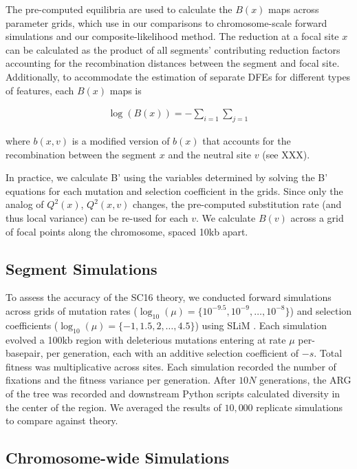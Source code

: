 \documentclass[11pt]{article}
\begin{document}
The pre-computed equilibria are used to calculate the $B(x)$ maps across
parameter grids, which use in our comparisons to chromosome-scale forward
simulations and our composite-likelihood method. The reduction at a focal site
$x$ can be calculated as the product of all segments' contributing reduction
factors accounting for the recombination distances between the segment and
focal site. Additionally, to accommodate the estimation of separate DFEs for
different types of features, each $B(x)$ maps is 

\begin{align}
    \log(B(x)) = - \sum_{i=1} \sum_{j=1} 
\end{align}

where $b(x, v)$ is a modified version of $b(x)$ that accounts for the
recombination between the segment $x$ and the neutral site $v$ (see XXX).

In practice, we calculate B' using the variables determined by solving the B'
equations for each mutation and selection coefficient in the grids. Since only
the analog of $Q^2(x)$, $Q^2(x, v)$ changes, the pre-computed substitution rate
(and thus local variance) can be re-used for each $v$. We calculate $B(v)$
across a grid of focal points along the chromosome, spaced 10kb apart.



\subsection*{Segment Simulations}
\label{sec:methods-segsim}

To assess the accuracy of the SC16 theory, we conducted forward simulations
across grids of mutation rates ($\log_{10}(\mu) = \{10^{-9.5}, 10^{-9}, \ldots,
10^{-8}\}$) and selection coefficients ($\log_{10}(\mu) = \{-1, 1.5, 2, \ldots,
4.5\}$) using SLiM \parencite{Haller2023-uk,Haller2019-vu}. Each simulation
evolved a 100kb region with deleterious mutations entering at rate $\mu$
per-basepair, per generation, each with an additive selection coefficient of
$-s$. Total fitness was multiplicative across sites. Each simulation recorded
the number of fixations and the fitness variance per generation. After $10N$
generations, the ARG of the tree was recorded and downstream Python scripts
calculated diversity in the center of the region. We averaged the results of
$10,000$ replicate simulations to compare against theory.

\subsection*{Chromosome-wide Simulations}
\end{document}
